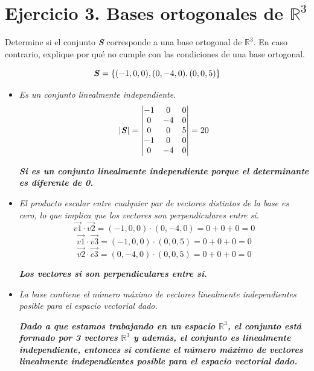 \FloatBarrier
\section{\large Ejercicio 3. Bases ortogonales de $\mathbb{R}^3$}

Determine si el conjunto \textbf{\textit{S}} corresponde a una base ortogonal de $\mathbb{R}^3$. En caso contrario, explique por qué no cumple con las condiciones de una base ortogonal.

\[
    \text{\textbf{\textit{S}}}=\left\{(-1,0,0),(0,-4,0),(0,0,5)\right\}
\]

\begin{itemize}
    \item \textit{Es un conjunto linealmente independiente.}
    \[
        \left|\text{\textbf{\textit{S}}}\right|=
        \begin{vmatrix}
            -1 & 0 & 0 \\
            0 & -4 & 0 \\
            0 & 0 & 5 \\
            -1 & 0 & 0 \\
            0 & -4 & 0 \\
        \end{vmatrix}
        =20
    \]
    \begin{center}
        \textbf{\textit{Si es un conjunto linealmente independiente porque el determinante es diferente de 0.}}
    \end{center}
    \item \textit{El producto escalar entre cualquier par de vectores distintos de la base es 
    cero, lo que implica que los vectores son perpendiculares entre sí.}
    \[
        \vec{v1}\cdot\vec{v2}=(-1,0,0)\cdot(0,-4,0)=0+0+0=0
    \]
    \[
        \vec{v1}\cdot\vec{v3}=(-1,0,0)\cdot(0,0,5)=0+0+0=0
    \]
    \[
        \vec{v2}\cdot\vec{c3}=(0,-4,0)\cdot(0,0,5)=0+0+0=0
    \]
    \begin{center}
        \textbf{\textit{Los vectores si son perpendiculares entre sí.}}
    \end{center}
    \item \textit{La base contiene el número máximo de vectores linealmente independientes 
    posible para el espacio vectorial dado.}
    \begin{center}
        \textbf{\textit{Dado a que estamos trabajando en un espacio $\mathbb{R}^3$, el conjunto está formado por 3 vectores $\mathbb{R}^3$ y además, el conjunto es linealmente independiente, entonces sí contiene el número máximo de vectores linealmente independientes posible para el espacio vectorial dado.}}
    \end{center}
\end{itemize}

